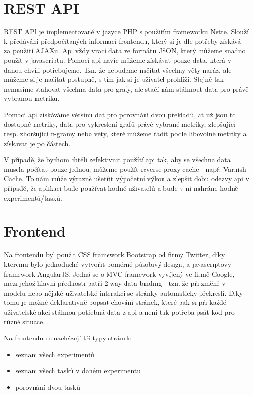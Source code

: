 \section{REST API}
REST API je implementované v jazyce PHP s použitím frameworku Nette.
Slouží k předávání předpočítaných informací frontendu,
  který si je dle potřeby získává za použití AJAXu.
Api vždy vrací data ve formátu JSON,
  který můžeme snadno použít v javascriptu.
Pomocí api navíc můžeme získávat pouze data,
  která v danou chvíli potřebujeme.
Tzn. že nebudeme načítat všechny věty naráz,
  ale můžeme si je načítat postupně,
  s tím jak si je uživatel prohlíží.
Stejně tak nemusíme stahovat všechna data pro grafy,
  ale stačí nám stáhnout data pro právě vybranou metriku.

Pomocí api získáváme většinu dat pro porovnání dvou překladů,
  ať už jsou to dostupné metriky,
  data pro vykreslení grafů právě vybrané metriky,
  zlepšující resp. zhoršující n-gramy
  nebo věty,
  které můžeme řadit podle libovolné metriky a získavat je po částech.

V případě, že bychom chtěli zefektivnit použítí api tak,
  aby se všechna data musela počítat pouze jednou,
  můžeme použít reverse proxy cache - např. Varnish Cache.
To nám může výrazně ušetřit výpočetní výkon a zlepšit dobu odezvy api v případě,
  že aplikaci bude používat hodně uživatelů
  a bude v ní nahráno hodně experimentů/tasků.

\section{Frontend}
Na frontendu byl použit CSS framework Bootstrap od firmy Twitter,
  díky kterému bylo jednoduché vytvořit poměrně působivý design,
  a javascriptový framework AngularJS.
Jedná se o MVC framework vyvíjený ve firmě Google,
  mezi jehož hlavní přednosti patří 2-way data binding -
  tzn. že při změně v modelu nebo nějaké uživatelské interakci se stránky automaticky překreslí.
Díky tomu je možné deklarativně popsat chování stránek,
  které pak si při každé uživatelské akci stáhnou potřebná data z api
  a není tak potřeba psát kód pro různé situace.

Na frontendu se nacházejí tři typy stránek:
\begin{itemize}
  \item seznam všech experimentů
  \item seznam všech tasků v daném experimentu
  \item porovnání dvou tasků
\end{itemize}

